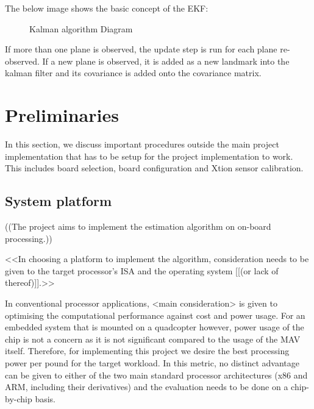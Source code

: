 \documentclass[]{article}
\begin{document}
{The below image shows the basic concept of the EKF:
\begin{figure}[H]
\centering     %
{} \;
\caption{Kalman algorithm Diagram}
\end{figure}

If more than one plane is observed, the update step is run for each plane re-observed. If a new plane is observed, it is added as a new landmark into the kalman filter and its covariance is added onto the covariance matrix.

\section{Preliminaries}
In this section, we discuss important procedures outside the main project implementation that has to be setup for the project implementation to work. This includes board selection, board configuration and Xtion sensor calibration. 
\subsection{System platform} %
\label{sub:system_platform}

((The project aims to implement the estimation algorithm on on-board processing.))

<<In choosing a platform to implement the algorithm, consideration needs to be given to the target processor's ISA and the operating system [[(or lack of thereof)]].>>

In conventional processor applications, <main consideration> is given to optimising the computational performance against cost and power usage. For an embedded system that is mounted on a quadcopter however, power usage of the chip is not a concern as it is not significant compared to the usage of the MAV itself. Therefore, for implementing this project we desire the best processing power per pound for the target workload. In this metric, no distinct advantage can be given to either of the two main standard processor architectures (x86 and ARM, including their derivatives) and the evaluation needs to be done on a chip-by-chip basis. 

}
\end{document}
